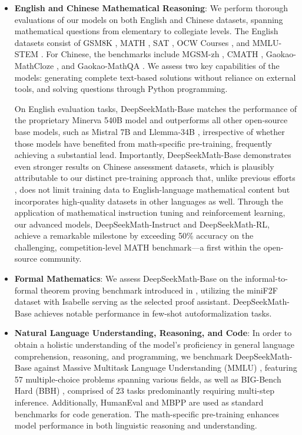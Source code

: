 \begin{itemize}[topsep=0pt]
    \item \textbf{English and Chinese Mathematical Reasoning}: We perform thorough evaluations of our models on both English and Chinese datasets, spanning mathematical questions from elementary to collegiate levels. The English datasets consist of GSM8K \citep{gsm8k}, MATH \citep{MATH}, SAT \citep{llemma}, OCW Courses \citep{minerva}, and MMLU-STEM \citep{mmlu}. For Chinese, the benchmarks include MGSM-zh \citep{mgsm}, CMATH \citep{wei2023cmath}, Gaokao-MathCloze \citep{agieval}, and Gaokao-MathQA \citep{agieval}. We assess two key capabilities of the models: generating complete text-based solutions without reliance on external tools, and solving questions through Python programming.

On English evaluation tasks, DeepSeekMath-Base matches the performance of the proprietary Minerva 540B model \citep{minerva} and outperforms all other open-source base models, such as Mistral 7B \citep{mistral} and Llemma-34B \citep{llemma}, irrespective of whether those models have benefited from math-specific pre-training, frequently achieving a substantial lead. Importantly, DeepSeekMath-Base demonstrates even stronger results on Chinese assessment datasets, which is plausibly attributable to our distinct pre-training approach that, unlike previous efforts \citep{minerva,llemma}, does not limit training data to English-language mathematical content but incorporates high-quality datasets in other languages as well. Through the application of mathematical instruction tuning and reinforcement learning, our advanced models, DeepSeekMath-Instruct and DeepSeekMath-RL, achieve a remarkable milestone by exceeding 50\% accuracy on the challenging, competition-level MATH benchmark—a first within the open-source community.

\item \textbf{Formal Mathematics}: We assess DeepSeekMath-Base on the informal-to-formal theorem proving benchmark introduced in \citep{dsp_proof}, utilizing the miniF2F dataset \citep{minif2f} with Isabelle \citep{isabelle} serving as the selected proof assistant. DeepSeekMath-Base achieves notable performance in few-shot autoformalization tasks.
\item \textbf{Natural Language Understanding, Reasoning, and Code}: In order to obtain a holistic understanding of the model's proficiency in general language comprehension, reasoning, and programming, we benchmark DeepSeekMath-Base against Massive Multitask Language Understanding (MMLU) \citep{mmlu}, featuring 57 multiple-choice problems spanning various fields, as well as BIG-Bench Hard (BBH) \citep{bbh}, comprised of 23 tasks predominantly requiring multi-step inference. Additionally, HumanEval \citep{codex} and MBPP \citep{mbpp} are used as standard benchmarks for code generation. The math-specific pre-training enhances model performance in both linguistic reasoning and understanding.


\end{itemize}

